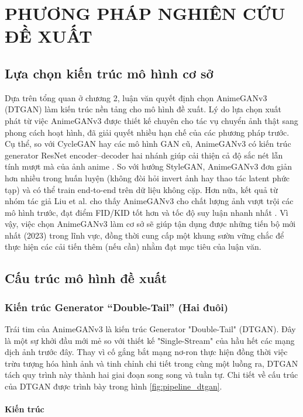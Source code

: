 
\setcounter{chapter}{1}
\chapter[{PHƯƠNG PHÁP NGHIÊN CỨU ĐỀ XUẤT}]{PHƯƠNG PHÁP NGHIÊN CỨU ĐỀ XUẤT}
\section{Lựa chọn kiến trúc mô hình cơ sở}
Dựa trên tổng quan ở chương 2, luận văn quyết định chọn AnimeGANv3 (DTGAN) làm kiến trúc nền tảng
cho mô hình đề xuất. Lý do lựa chọn xuất phát từ việc AnimeGANv3 được thiết kế chuyên cho tác vụ chuyển
ảnh thật sang phong cách hoạt hình, đã giải quyết nhiều hạn chế của các phương pháp trước. Cụ thể, so
với CycleGAN hay các mô hình GAN cũ, AnimeGANv3 có kiến trúc generator ResNet encoder–decoder hai
nhánh giúp cải thiện cả độ sắc nét lẫn tính mượt mà của ảnh anime . So với hướng StyleGAN,
AnimeGANv3 đơn giản hơn nhiều trong huấn luyện (không đòi hỏi invert ảnh hay thao tác latent phức tạp)
và có thể train end-to-end trên dữ liệu không cặp. Hơn nữa, kết quả từ nhóm tác giả Liu et al. cho thấy
AnimeGANv3 cho chất lượng ảnh vượt trội các mô hình trước, đạt điểm FID/KID tốt hơn và tốc độ suy luận
nhanh nhất . Vì vậy, việc chọn AnimeGANv3 làm cơ sở sẽ giúp tận dụng được những tiến bộ mới nhất
(2023) trong lĩnh vực, đồng thời cung cấp một khung sườn vững chắc để thực hiện các cải tiến thêm (nếu
cần) nhằm đạt mục tiêu của luận văn.

\section{Cấu trúc mô hình đề xuất}
\subsection{Kiến trúc Generator “Double-Tail” (Hai đuôi)}

Trái tim của AnimeGANv3 là kiến trúc Generator "Double-Tail" (DTGAN). Đây là một sự khởi đầu mới mẻ so 
với thiết kế "Single-Stream" của hầu hết các mạng dịch ảnh trước đây. Thay vì cố gắng bắt mạng nơ-ron 
thực hiện đồng thời việc trừu tượng hóa hình ảnh và tinh chỉnh chi tiết trong cùng một luồng ra, DTGAN 
tách quy trình này thành hai giai đoạn song song và tuần tự. Chi tiết về cấu trúc của DTGAN được trình bày 
trong hình \ref{fig:pipeline_dtgan}.

\subsubsection{Kiến trúc}

